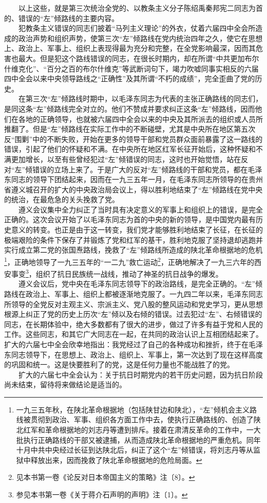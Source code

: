\documentclass[cn,11pt,chinese]{elegantbook}
\begin{document}
　　以上这些，就是第三次统治全党的、以教条主义分子陈绍禹秦邦宪二同志为首的、错误的“左”倾路线的主要内容。\\
　　犯教条主义错误的同志们披着“马列主义理论”的外衣，仗着六届四中全会所造成的政治声势和组织声势，使第三次“左”倾路线在党内统治四年之久，使它在思想上、政治上、军事上、组织上表现得最为充分和完整，在全党影响最深，因而其危害也最大。但是犯这个路线错误的同志，在很长时期内，却在所谓“中共更加布尔什维克化”、“百分之百的布尔什维克”等武断词句下，竭力吹嘘同事实相反的六届四中全会以来中央领导路线之“正确性”及其所谓“不朽的成绩”，完全歪曲了党的历史。\\
　　在第三次“左”倾路线时期中，以毛泽东同志为代表的主张正确路线的同志们，是同这条“左”倾路线完全对立的。他们不赞成并要求纠正这条“左”倾路线，因而他们在各地的正确领导，也就被六届四中全会以来的中央及其所派去的组织或人员所推翻了。但是“左”倾路线在实际工作中的不断碰壁，尤其是中央所在地区第五次反“围剿”中的不断失败，开始在更多的领导干部和党员群众面前暴露了这一路线的错误，引起了他们的怀疑和不满。在中央所在地区红军长征开始后，这种怀疑和不满更加增长，以至有些曾经犯过“左”倾错误的同志，这时也开始觉悟，站在反对“左”倾错误的立场上来了。于是广大的反对“左”倾路线的干部和党员，都在毛泽东同志的领导下团结起来，因而在一九三五年一月，在毛泽东同志所领导的在贵州省遵义城召开的扩大的中央政治局会议上，得以胜利地结束了“左”倾路线在党中央的统治，在最危急的关头挽救了党。\\
　　遵义会议集中全力纠正了当时具有决定意义的军事上和组织上的错误，是完全正确的。这次会议开始了以毛泽东同志为首的中央的新的领导，是中国党内最有历史意义的转变。也正是由于这一转变，我们党才能够胜利地结束了长征，在长征的极端艰险的条件下保存了并锻炼了党和红军的基干，胜利地克服了坚持退却逃跑并实行成立第二党的张国焘路线，挽救了“左”倾路线所造成的陕北革命根据地的危机\footnote[12]{ 一九三五年秋，在陕北革命根据地（包括陕甘边和陕北），“左”倾机会主义路线被贯彻到政治、军事、组织各方面工作中去，使执行正确路线的、创造了陕北红军和革命根据地的刘志丹等遭到排斥。接着在肃清反革命的工作中，一大批执行正确路线的干部又被逮捕，从而造成陕北革命根据地的严重危机。同年十月中共中央经过长征到达陕北后，纠正了这个“左”倾错误，将刘志丹等从监狱中释放出来，因而挽救了陕北革命根据地的危险局面。}，正确地领导了一九三五年的“一二九”救亡运动\footnote[13]{ 见本书第一卷《论反对日本帝国主义的策略》注〔8〕。}，正确地解决了一九三六年的西安事变\footnote[14]{ 参见本书第一卷《关于蒋介石声明的声明》注〔1〕。}，组织了抗日民族统一战线，推动了神圣的抗日战争的爆发。\\
　　遵义会议后，党中央在毛泽东同志领导下的政治路线，是完全正确的。“左”倾路线在政治上、军事上、组织上都被逐渐地克服了。一九四二年以来，毛泽东同志所领导的全党反对主观主义、宗派主义、党八股的整风运动和党史学习，更从思想根源上纠正了党的历史上历次“左”倾以及右倾的错误。过去犯过“左”、右倾错误的同志，在长期体验中，绝大多数都有了很大的进步，做过了许多有益于党和人民的工作。这些同志，和其它广大同志在一起，在共同的政治认识上互相团结起来了。扩大的六届七中全会欣幸地指出：我党经过了自己的各种成功和挫折，终于在毛泽东同志领导下，在思想上、政治上、组织上、军事上，第一次达到了现在这样高度的巩固和统一。这是快要胜利了的党，这是任何力量也不能战胜了的党。\\
　　扩大的六届七中全会认为：关于抗日时期党内的若干历史问题，因为抗日阶段尚未结束，留待将来做结论是适当的。\\
\end{document}
